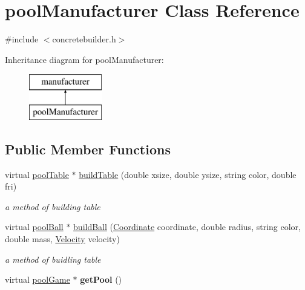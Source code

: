 \hypertarget{classpool_manufacturer}{}\section{pool\+Manufacturer Class Reference}
\label{classpool_manufacturer}


{\ttfamily \#include $<$concretebuilder.\+h$>$}

Inheritance diagram for pool\+Manufacturer\+:\begin{figure}[H]
\begin{center}
\leavevmode
\includegraphics[height=2.000000cm]{classpool_manufacturer}
\end{center}
\end{figure}
\subsection*{Public Member Functions}
\begin{DoxyCompactItemize}
\item 
\mbox{\label{classpool_manufacturer_a414e88ee1fd96bdf39525dae19ad147b}} 
virtual \mbox{\hyperlink{classpool_table}{pool\+Table}} $\ast$ \mbox{\hyperlink{classpool_manufacturer_a414e88ee1fd96bdf39525dae19ad147b}{build\+Table}} (double xsize, double ysize, string color, double fri)
\begin{DoxyCompactList}\small\item\em a method of building table \end{DoxyCompactList}\item 
\mbox{\label{classpool_manufacturer_aa61c2bdc11ec1f78dae73cae74914f3c}} 
virtual \mbox{\hyperlink{classpool_ball}{pool\+Ball}} $\ast$ \mbox{\hyperlink{classpool_manufacturer_aa61c2bdc11ec1f78dae73cae74914f3c}{build\+Ball}} (\mbox{\hyperlink{class_coordinate}{Coordinate}} coordinate, double radius, string color, double mass, \mbox{\hyperlink{class_velocity}{Velocity}} velocity)
\begin{DoxyCompactList}\small\item\em a method of buidling table \end{DoxyCompactList}\item 
\mbox{\label{classpool_manufacturer_a277aac732a912c5435a815ff4ec44d6c}} 
virtual \mbox{\hyperlink{classpool_game}{pool\+Game}} $\ast$ {\bfseries get\+Pool} ()
\end{DoxyCompactItemize}
